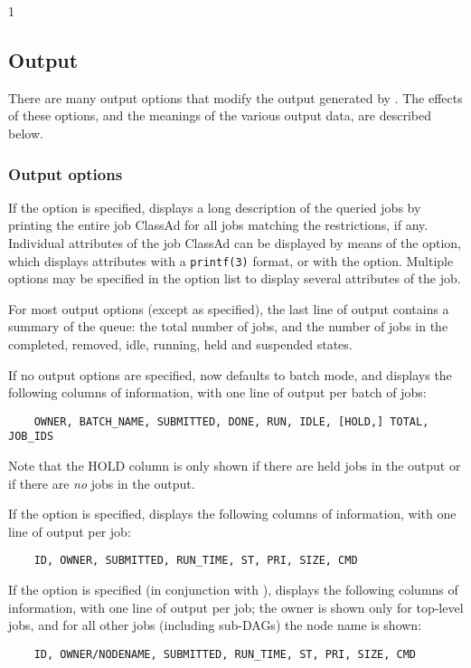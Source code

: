 \begin{ManPage}{\label{man-condor-q}}{1}
\subsection*{Output}

There are many output options that modify the output generated by
.  The effects of these options, and the meanings of the
various output data, are described below.

\subsubsection*{Output options}
If the  option is specified,  displays a long description 
of the queried jobs by printing the entire job ClassAd for all jobs
matching the restrictions, if any.
Individual attributes of the job ClassAd can be displayed by means of the
 option, which displays attributes with a \verb+printf(3)+
format, or with the  option.
Multiple  options may be specified in the option list to display
several attributes of the job.

For most output options (except as specified), the last line of
 output contains a summary of the queue: the total
number of jobs, and the number of jobs in the completed, removed,
idle, running, held and suspended states.

If no output options are specified,  now defaults to
batch mode, and displays the following columns of information, with
one line of output per batch of jobs:
\begin{verbatim}
    OWNER, BATCH_NAME, SUBMITTED, DONE, RUN, IDLE, [HOLD,] TOTAL, JOB_IDS
\end{verbatim}
Note that the HOLD column is only shown if there are held jobs in
the output or if there are \emph{no} jobs in the output.

If the  option is specified,  displays the
following columns of information, with one line of output
per job:
\begin{verbatim}
    ID, OWNER, SUBMITTED, RUN_TIME, ST, PRI, SIZE, CMD
\end{verbatim}

If the  option is specified (in conjunction with ),
 displays the following columns of information, with one line
of output per job; the owner is shown only for top-level jobs, and for
all other jobs (including sub-DAGs) the node name is shown:
\begin{verbatim}
    ID, OWNER/NODENAME, SUBMITTED, RUN_TIME, ST, PRI, SIZE, CMD
\end{verbatim}


\end{ManPage}
